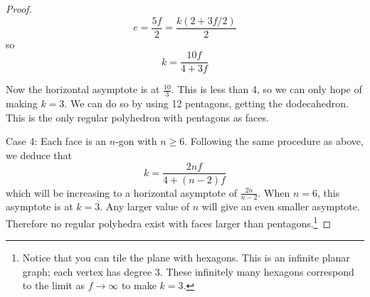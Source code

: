 \documentclass[10pt,]{book}
\theoremstyle{plain}
\theoremstyle{definition}
\theoremstyle{definition}
\theoremstyle{definition}
\theoremstyle{definition}
\numberwithin{equation}{chapter}
\begin{document}
\begin{proof}
\begin{equation*}
e = \frac{5f}{2} = \frac{k(2+3f/2)}{2}
\end{equation*}
so%
\begin{equation*}
k = \frac{10f}{4+3f}
\end{equation*}
%
\par
\hypertarget{p-281}{}%
Now the horizontal asymptote is at \(\frac{10}{3}\). This is less than 4, so we can only hope of making \(k = 3\). We can do so by using 12 pentagons, getting the dodecahedron. This is the only regular polyhedron with pentagons as faces.%
\par
\hypertarget{p-282}{}%
Case 4: Each face is an \(n\)-gon with \(n \ge 6\). Following the same procedure as above, we deduce that%
\begin{equation*}
k = \frac{2nf}{4+(n-2)f}
\end{equation*}
which will be increasing to a horizontal asymptote of \(\frac{2n}{n-2}\). When \(n = 6\), this asymptote is at \(k = 3\). Any larger value of \(n\) will give an even smaller asymptote. Therefore no regular polyhedra exist with faces larger than pentagons.\footnote{Notice that you can tile the plane with hexagons.  This is an infinite planar graph; each vertex has degree 3.  These infinitely many hexagons correspond to the limit as \(f \to \infty\) to make \(k = 3\).\label{fn-3}}%
\end{proof}
\typeout{************************************************}
\typeout{************************************************}
\end{document}
